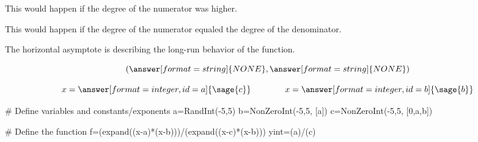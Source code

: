 {\begin{problem}
\begin{problem}
\begin{problem}
\begin{feedback}[HA>1]
This would happen if the degree of the numerator was higher.
\end{feedback}

\begin{feedback}[HA=1]
This would happen if the degree of the numerator equaled the degree of the denominator.
\end{feedback}

\begin{feedback}[correct]
The horizontal asymptote is describing the long-run behavior of the function.
\end{feedback}


\end{problem}

\[(\answer[format=string]{NONE}, \answer[format=string]{NONE})\]

\end{problem}

\[x=\answer[format=integer,id=a]{\sage{c}}\qquad\qquad x=\answer[format=integer,id=b]{\sage{b}}\]


\end{problem}}%

\begin{sagesilent}
# Define variables and constants/exponents
a=RandInt(-5,5)
b=NonZeroInt(-5,5, [a])
c=NonZeroInt(-5,5, [0,a,b])

# Define the function
f=(expand((x-a)*(x-b)))/(expand((x-c)*(x-b)))
yint=(a)/(c)
\end{sagesilent}
 
